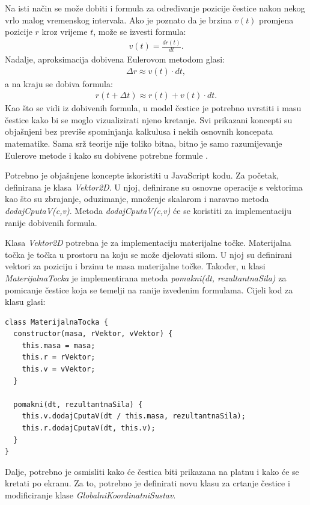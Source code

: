 \documentclass{foi}
\begin{document}
Na isti način se može dobiti i formula za određivanje pozicije čestice nakon nekog vrlo malog vremenskog intervala. Ako je poznato da je brzina $v(t)$ promjena pozicije $r$ kroz vrijeme $t$, može se izvesti formula:
 \begin{align*}
v(t) = \frac{dr(t)}{dt}.
\end{align*}
Nadalje, aproksimacija dobivena Eulerovom metodom glasi:
 \begin{align*}
\Delta r \approx v(t) \cdot dt,
\end{align*}
a na kraju se dobiva formula:
 \begin{align*}
r(t + \Delta t) \approx r(t) + v(t) \cdot dt.
\end{align*}
Kao što se vidi iz dobivenih formula, u model čestice je potrebno uvrstiti i masu čestice kako bi se moglo vizualizirati njeno kretanje. Svi prikazani koncepti su objašnjeni bez previše spominjanja kalkulusa i nekih osnovnih koncepata matematike. Sama srž teorije nije toliko bitna, bitno je samo razumijevanje Eulerove metode i kako su dobivene potrebne formule \parencite{HipHorvatFizika}.

Potrebno je objašnjene koncepte iskoristiti u JavaScript kodu. Za početak, definirana je klasa \textit{Vektor2D}. U njoj, definirane su osnovne operacije s vektorima kao što su zbrajanje, oduzimanje, množenje skalarom i naravno metoda \textit{dodajCputaV(c,v)}. Metoda \textit{dodajCputaV(c,v)} će se koristiti za implementaciju ranije dobivenih formula.

Klasa \textit{Vektor2D} potrebna je za implementaciju materijalne točke. Materijalna točka je točka u prostoru na koju se može djelovati silom. U njoj su definirani vektori za poziciju i brzinu te masa materijalne točke. Također, u klasi \textit{MaterijalnaTocka} je implementirana metoda \textit{pomakni(dt, rezultantnaSila)} za pomicanje čestice koja se temelji na ranije izvedenim formulama. Cijeli kod za klasu glasi:

\begin{verbatim}
class MaterijalnaTocka {
  constructor(masa, rVektor, vVektor) {
    this.masa = masa;
    this.r = rVektor;
    this.v = vVektor;
  }

  pomakni(dt, rezultantnaSila) {
    this.v.dodajCputaV(dt / this.masa, rezultantnaSila);
    this.r.dodajCputaV(dt, this.v);
  }
}
\end{verbatim}

Dalje, potrebno je osmisliti kako će čestica biti prikazana na platnu i kako će se kretati po ekranu. Za to, potrebno je definirati novu klasu za crtanje čestice i modificiranje klase \textit{GlobalniKoordinatniSustav}. 
\end{document}
